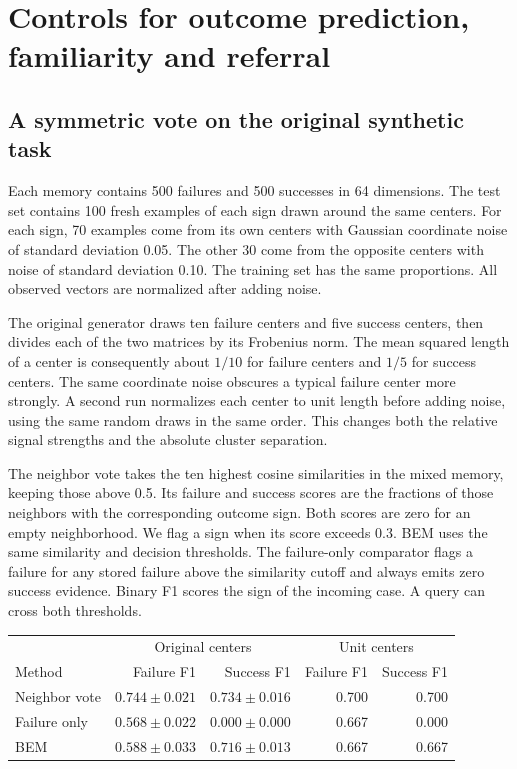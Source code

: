 \section{Controls for outcome prediction, familiarity and referral}
\label{app:controlref}

\subsection{A symmetric vote on the original synthetic task}

Each memory contains 500 failures and 500 successes in 64 dimensions. The
test set contains 100 fresh examples of each sign drawn around the same
centers. For each sign, 70 examples come from its own centers with Gaussian
coordinate noise of standard deviation 0.05. The other 30 come from the
opposite centers with noise of standard deviation 0.10. The training set has
the same proportions. All observed vectors are normalized after adding noise.

The original generator draws ten failure centers and five success centers,
then divides each of the two matrices by its Frobenius norm. The mean squared
length of a center is consequently about $1/10$ for failure centers and $1/5$
for success centers. The same coordinate noise obscures a typical failure
center more strongly. A second run normalizes each center to unit length
before adding noise, using the same random draws in the same order. This
changes both the relative signal strengths and the absolute cluster separation.

The neighbor vote takes the ten highest cosine similarities in the mixed
memory, keeping those above 0.5. Its failure and success scores are the
fractions of those neighbors with the corresponding outcome sign. Both
scores are zero for an empty neighborhood. We flag a sign when its score
exceeds 0.3. BEM uses the same similarity and decision thresholds.
The failure-only comparator flags a failure for any stored failure above
the similarity cutoff and always emits zero success evidence. Binary F1
scores the sign of the incoming case. A query can cross both thresholds.

\begin{center}
\small
\begin{tabular}{lrrrr}
\toprule
 & \multicolumn{2}{c}{Original centers} & \multicolumn{2}{c}{Unit centers} \\
Method & Failure F1 & Success F1 & Failure F1 & Success F1 \\
\midrule
Neighbor vote & $0.744\pm0.021$ & $0.734\pm0.016$ & 0.700 & 0.700 \\
Failure only  & $0.568\pm0.022$ & $0.000\pm0.000$ & 0.667 & 0.000 \\
BEM           & $0.588\pm0.033$ & $0.716\pm0.013$ & 0.667 & 0.667 \\
\bottomrule
\end{tabular}
\end{center}

